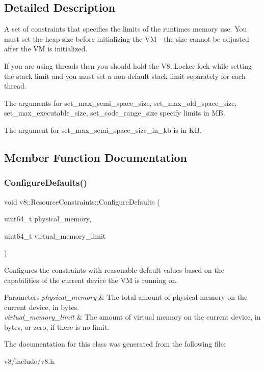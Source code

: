 \subsection{Detailed Description}
A set of constraints that specifies the limits of the runtime\textquotesingle{}s memory use. You must set the heap size before initializing the VM -\/ the size cannot be adjusted after the VM is initialized.

If you are using threads then you should hold the V8\+::\+Locker lock while setting the stack limit and you must set a non-\/default stack limit separately for each thread.

The arguments for set\+\_\+max\+\_\+semi\+\_\+space\+\_\+size, set\+\_\+max\+\_\+old\+\_\+space\+\_\+size, set\+\_\+max\+\_\+executable\+\_\+size, set\+\_\+code\+\_\+range\+\_\+size specify limits in MB.

The argument for set\+\_\+max\+\_\+semi\+\_\+space\+\_\+size\+\_\+in\+\_\+kb is in KB. 

\subsection{Member Function Documentation}
\mbox{\label{classv8_1_1ResourceConstraints_aeeaaee4017e8d5f8f0439af2af2ed3a5}} 
\subsubsection{\texorpdfstring{Configure\+Defaults()}{ConfigureDefaults()}}
{\footnotesize\ttfamily void v8\+::\+Resource\+Constraints\+::\+Configure\+Defaults (\begin{DoxyParamCaption}\item[{uint64\+\_\+t}]{physical\+\_\+memory,  }\item[{uint64\+\_\+t}]{virtual\+\_\+memory\+\_\+limit }\end{DoxyParamCaption})}

Configures the constraints with reasonable default values based on the capabilities of the current device the VM is running on.


\begin{DoxyParams}{Parameters}
{\em physical\+\_\+memory} & The total amount of physical memory on the current device, in bytes. \\
\hline
{\em virtual\+\_\+memory\+\_\+limit} & The amount of virtual memory on the current device, in bytes, or zero, if there is no limit. \\
\hline
\end{DoxyParams}


The documentation for this class was generated from the following file\+:\begin{DoxyCompactItemize}
\item 
v8/include/v8.\+h\end{DoxyCompactItemize}
